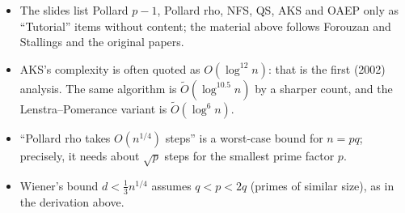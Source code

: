 \begin{fixbox}
\begin{itemize}[leftmargin=1.2em,itemsep=0pt]
  \item The slides list Pollard $p - 1$, Pollard rho, NFS, QS, AKS and OAEP only as ``Tutorial'' items without content; the material above follows Forouzan and Stallings and the original papers.
  \item AKS's complexity is often quoted as $O(\log^{12} n)$: that is the first (2002) analysis. The same algorithm is $\tilde O(\log^{10.5} n)$ by a sharper count, and the Lenstra--Pomerance variant is $\tilde O(\log^{6} n)$.
  \item ``Pollard rho takes $O(n^{1/4})$ steps'' is a worst-case bound for $n = pq$; precisely, it needs about $\sqrt p$ steps for the smallest prime factor $p$.
  \item Wiener's bound $d < \frac13 n^{1/4}$ assumes $q < p < 2q$ (primes of similar size), as in the derivation above.
\end{itemize}
\end{fixbox}
